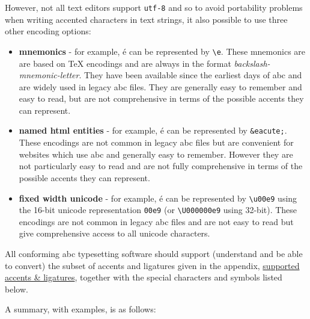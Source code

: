 \documentclass[oneside]{book}
\begin{document}
However, not all text editors support \texttt{utf-8} and so to avoid
portability problems when writing accented characters in text strings,
it also possible to use three other encoding options:

\begin{itemize}
\item
  \textbf{mnemonics} - for example, é can be represented by
  \texttt{\textbackslash{}\textquotesingle{}e}. These mnemonics are are
  based on TeX encodings and are always in the format
  \emph{backslash-mnemonic-letter}. They have been available since the
  earliest days of abc and are widely used in legacy abc files. They are
  generally easy to remember and easy to read, but are not comprehensive
  in terms of the possible accents they can represent.
\item
  \textbf{named html entities} - for example, é can be represented by
  \texttt{\&eacute;}. These encodings are not common in legacy abc files
  but are convenient for websites which use abc and generally easy to
  remember. However they are not particularly easy to read and are not
  fully comprehensive in terms of the possible accents they can
  represent.
\item
  \textbf{fixed width unicode} - for example, é can be represented by
  \texttt{\textbackslash{}u00e9} using the 16-bit unicode representation
  \texttt{00e9} (or \texttt{\textbackslash{}U000000e9} using 32-bit).
  These encodings are not common in legacy abc files and are not easy to
  read but give comprehensive access to all unicode characters.
\end{itemize}

All conforming abc typesetting software should support (understand and
be able to convert) the subset of accents and ligatures given in the
appendix, \protect\hyperlink{supported_accents_ligatures}{supported
accents \& ligatures}, together with the special characters and symbols
listed below.

A summary, with examples, is as follows:
\end{document}
